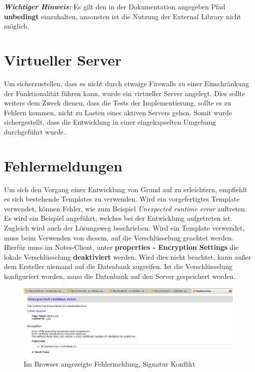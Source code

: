 \vspace{0.5cm}

\begin{graybox}
\textbf{\textit{Wichtiger Hinweis:}} Es gilt den in der Dokumentation angegeben Pfad \textbf{unbedingt} einzuhalten, ansonsten ist die Nutzung der External Library 
nicht möglich.
\end{graybox}




\vspace{0.5cm}
\section{Virtueller Server}
\label{sec:6template}

Um sicherzustellen, dass es nicht durch etwaige Firewalls zu einer Einschränkung der Funktionalität führen kann, wurde ein virtueller Server angelegt.
Dies sollte weiters dem Zweck dienen, dass die Tests der Implementierung, sollte es zu Fehlern kommen, nicht zu Lasten eines aktiven Servers gehen.
Somit wurde sichergestellt, dass die Entwicklung in einer eingekapselten Umgebung durchgeführt wurde.

\section{Fehlermeldungen}
\label{sec:6template}

Um sich den Vorgang einer Entwicklung von Grund auf zu erleichtern, empfiehlt es sich bestehende Templates zu verwenden.
Wird ein vorgefertigtes Template verwendet, können Fehler, wie zum Beispiel \textit{Unexpected runtime error} auftreten.
\newline
Es wird ein Beispiel angeführt, welches bei der Entwicklung aufgetreten ist. Zugleich wird auch der Lösungsweg beschrieben.
Wird ein Template verwendet, muss beim Verwenden von diesem, auf die Verschlüsselung geachtet werden. Hierfür muss im Notes-Client, unter
\textbf{properties - Encryption Settings} die lokale Verschlüsselung \textbf{deaktiviert} werden. Wird dies nicht beachtet, kann außer dem Ersteller 
niemand auf die Datenbank zugreifen. Ist die Verschlüsselung konfiguriert worden, muss die Datenbank auf den Server
gespeichert werden.
\vspace{0.5cm}
\begin{figure}[H]
    \centerline{\includegraphics[scale=0.4]{pics/runtimeError}}
    \caption[Fehlermeldung - Unexpected runtime error]{\label{FiG:Unexpected-Runtime-Error }
	Im Browser angezeigte Fehlermeldung, Signatur Konflikt }
\end{figure} 

